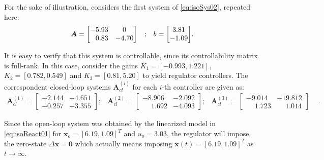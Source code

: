 \documentclass[a4paper,11pt]{book}
\numberwithin{figure}{chapter}
\numberwithin{equation}{chapter}
\numberwithin{table}{chapter}
\theoremstyle{definition}
\newtheorem{example}{Example}[chapter]
\newcounter{boxed-theorem}
\newcounter{boxed-lemma}
\newcounter{boxed-definition}
\newcounter{boxed-example}
\newenvironment{boxed-example}[1]
{\colorlet{shadecolor}{pastelRed!15} \begin{shaded} \begin{example}{#1}}
{\end{example} \end{shaded}}
\begin{document}
\begin{boxed-example}{} \label{ex:regulator01}
	For the sake of illustration, considers the first system of \eqref{eq:isoSys02}, repeated here:
	\begin{equation} \label{eq:isoSys02Rep}
	\begin{matrix}
	    \bm{A} = \begin{bmatrix} 
	        -5.93  &      0 \\
	        \hfill 0.83   &  -4.70 
	    \end{bmatrix} &; & b = \begin{bmatrix} 3.81 \\ -1.09 \end{bmatrix}
	\end{matrix}    
	.\end{equation}
	
	\noindent It is easy to verify that this system is controllable, since its controllability matrix is full-rank. In this case, consider the gains $K_1 = [-0.993, 1.221]$, $K_2 = [0.782, 0.549]$ and $K_3 = [0.81, 5.20]$ to yield regulator controllers. The correspondent closed-loop systems $\bm{A}^{(i)}_{cl}$ for each $i$-th controller are given as:
	\begin{equation}
	\begin{matrix}
		\bm{A}^{(1)}_{cl} = \begin{bmatrix} 
	        -2.144 &  -4.651 \\
		   -0.257 & -3.355
	    \end{bmatrix}; & 
	    \bm{A}^{(2)}_{cl} = \begin{bmatrix} 
	        -8.906 & -2.092 \\
    		\phantom{-}1.692 & -4.093
	    \end{bmatrix}; &
	    \bm{A}^{(3)}_{cl} = \begin{bmatrix} 
	        -9.014 & -19.812 \\
    		\phantom{-}1.723 & \phantom{-}1.014
	    \end{bmatrix} &
	\end{matrix}
	.\end{equation}
	
	\noindent Since the open-loop system was obtained by the linearized model in \eqref{eq:isoReact01} for $\bm{x}_o = [6.19, 1.09]^T$ and $u_o = 3.03$, the regulator will impose the zero-state $\Delta \bm{x} = \bm{0}$ which actually means imposing $\bm{x}(t) = [6.19, 1.09]^T$ as $t \to \infty$. 
\end{boxed-example}
\end{document}
